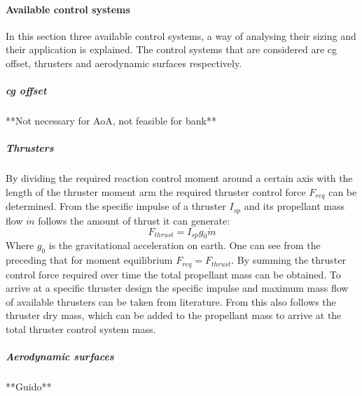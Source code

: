 \paragraph{Available control systems}
\label{control:system}
In this section three available control systems, a way of analysing their sizing and their application is explained. The control systems that are considered are \gls{cg} offset, thrusters and aerodynamic surfaces respectively.

\subparagraph{\acrfull{cg} offset}

**Not necessary for AoA, not feasible for bank**

\subparagraph{Thrusters}
By dividing the required reaction control moment around a certain axis with the length of the thruster moment arm the required thruster control force $F_{req}$ can be determined. From the specific impulse of a thruster $I_{sp}$ and its propellant mass flow $\dot{m}$ follows the amount of thrust it can generate:
\begin{equation}
F_{thrust}=I_{sp}g_{0}\dot{m}
\label{eq:Fthrust}
\end{equation}
Where $g_{0}$ is the gravitational acceleration on earth. One can see from the preceding that for moment equilibrium $F_{req}=F_{thrust}$. By summing the thruster control force required over time the total propellant mass can be obtained. To arrive at a specific thruster design the specific impulse and maximum mass flow of available thrusters can be taken from literature. From this also follows the thruster dry mass, which can be added to the propellant mass to arrive at the total thruster control system mass.
\subparagraph{Aerodynamic surfaces}

**Guido**